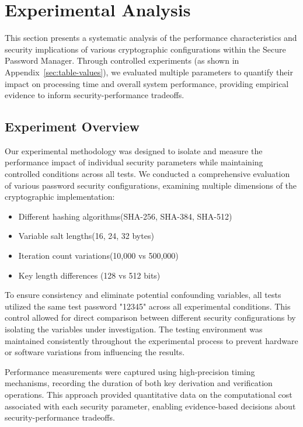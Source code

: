 \documentclass[11pt,a4paper]{article}
\begin{document}
\section{Experimental Analysis}
This section presents a systematic analysis of the performance characteristics and security implications of various cryptographic configurations within the Secure Password Manager. Through controlled experiments (as shown in Appendix~\ref{sec:table-values}), we evaluated multiple parameters to quantify their impact on processing time and overall system performance, providing empirical evidence to inform security-performance tradeoffs.

\subsection{Experiment Overview}
Our experimental methodology was designed to isolate and measure the performance impact of individual security parameters while maintaining controlled conditions across all tests. We conducted a comprehensive evaluation of various password security configurations, examining multiple dimensions of the cryptographic implementation:

\begin{itemize}
  \item Different hashing algorithms(SHA-256, SHA-384, SHA-512)
  \item Variable salt lengths(16, 24, 32 bytes)
  \item Iteration count variations(10,000 vs 500,000)
  \item Key length differences (128 vs 512 bits)
\end{itemize}

To ensure consistency and eliminate potential confounding variables, all tests utilized the same test password "12345" across all experimental conditions. This control allowed for direct comparison between different security configurations by isolating the variables under investigation. The testing environment was maintained consistently throughout the experimental process to prevent hardware or software variations from influencing the results.

Performance measurements were captured using high-precision timing mechanisms, recording the duration of both key derivation and verification operations. This approach provided quantitative data on the computational cost associated with each security parameter, enabling evidence-based decisions about security-performance tradeoffs.
\end{document}

